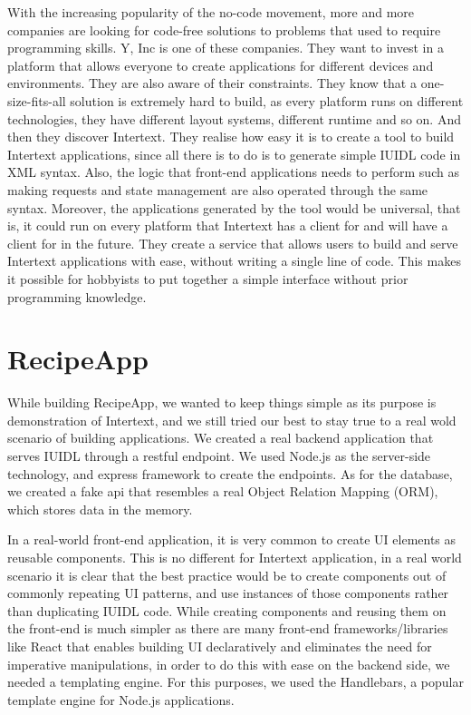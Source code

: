 With the increasing popularity of the no-code movement, more and more companies are looking for code-free solutions to problems that used to require programming skills. Y, Inc is one of these companies. They want to invest in a platform that allows everyone to create applications for different devices and environments. They are also aware of their constraints. They know that a one-size-fits-all solution is extremely hard to build, as every platform runs on different technologies, they have different layout systems, different runtime and so on. And then they discover Intertext. They realise how easy it is to create a tool to build Intertext applications, since all there is to do is to generate simple IUIDL code in XML syntax. Also, the logic that front-end applications needs to perform such as making requests and state management are also operated through the same syntax. Moreover, the applications generated by the tool would be universal, that is, it could run on every platform that Intertext has a client for and will have a client for in the future. They create a service that allows users to build and serve Intertext applications with ease, without writing a single line of code. This makes it possible for hobbyists to put together a simple interface without prior programming knowledge.

 
\section{RecipeApp}

While building RecipeApp, we wanted to keep things simple as its purpose is demonstration of Intertext, and we still tried our best to stay true to a real wold scenario of building applications. We created a real backend application that serves IUIDL through a restful endpoint. We used Node.js as the server-side technology, and express framework to create the endpoints. As for the database, we created a fake api that resembles a real Object Relation Mapping (ORM), which stores data in the memory.

In a real-world front-end application, it is very common to create UI elements as reusable components. This is no different for Intertext application, in a real world scenario it is clear that the best practice would be to create components out of commonly repeating UI patterns, and use instances of those components rather than duplicating IUIDL code. While creating components and reusing them on the front-end is much simpler as there are many front-end frameworks/libraries like React that enables building UI declaratively and eliminates the need for imperative manipulations, in order to do this with ease on the backend side, we needed a templating engine. For this purposes, we used the Handlebars, a popular template engine for Node.js applications.


